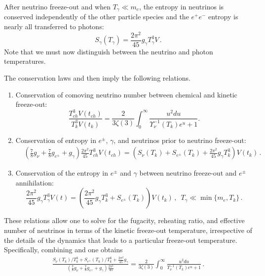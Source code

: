 After neutrino freeze-out and when $T_{\gamma}\ll m_e$, the entropy in neutrinos is conserved independently of the other particle species and the $e^+e^-$ entropy is nearly all transferred to photons:
\begin{equation}
S_{\gamma}(T_\gamma)=\frac{2 \pi^2}{45}g_\gamma T_{\gamma}^3 V\,.
\end{equation}
 Note that we must now distinguish between the neutrino and photon temperatures.

The conservation laws  and  then imply the following relations.
\begin{enumerate}
\item Conservation of comoving neutrino number between chemical and kinetic freeze-out:
\begin{equation}\label{modindeq1}
\frac{T_{ch}^3V(t_{ch})}{T_k^3V(t_k)}=\frac{2}{3\zeta(3)}\int_0^\infty \frac{u^2 du}{\Upsilon_\nu^{-1}(T_k)e^u+1}.
\end{equation}
\item Conservation of entropy in $e^\pm$, $\gamma$, and neutrinos prior to neutrino freeze-out:
\begin{align}\label{modindeq2}
&\left(\frac{7}{8}g_\nu+\frac{7}{8}g_{e^\pm} +g_\gamma \right)\frac{2\pi^2}{45} T_{ch}^3V(t_{ch})=\left(S_{\nu}(T_k)+S_{e^\pm}(T_k)+\frac{2\pi^2}{45}g_\gamma T_k^3\right)V(t_k)\,.
\end{align}
\item Conservation of the entropy in $e^\pm$ and $\gamma$ between neutrino freeze-out and $e^\pm$ annihilation:
\begin{equation}\label{modindeq3}
\frac{2 \pi^2}{45}g_\gamma T_{\gamma}^3 V(t)=\left(\frac{2\pi^2}{45}g_\gamma T_k^3+S_{e^\pm}(T_k)\right)V(t_k)\,, \,\,\, T_\gamma\ll \min\{m_e, T_k\}\,.
\end{equation}
\end{enumerate}

These relations allow one to solve for the fugacity, reheating ratio, and effective number of neutrinos in terms of the kinetic freeze-out temperature, irrespective of the details of the dynamics that leads to a particular freeze-out temperature. Specifically, combining  and  one obtains
\begin{align}
 \frac{S_{\nu}(T_k)/T_k^3+S_{e^\pm}(T_k)/T_k^3+\frac{2\pi^2}{45}g_\gamma }{\left(\frac{7}{8}g_\nu+\frac{7}{8}g_{e^\pm} +g_\gamma \right)\frac{2\pi^2}{45} }=\frac{2}{3\zeta(3)}\int_0^\infty \frac{u^2 du}{\Upsilon_\nu^{-1}(T_k)e^u+1}\,.
\end{align}

